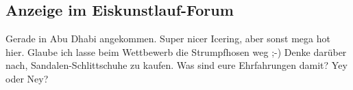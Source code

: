 \documentclass[final]{multiversum}
\begin{document}













\subsection{Anzeige im Eiskunstlauf-Forum}
Gerade in Abu Dhabi angekommen. 
Super nicer Icering, aber sonst mega hot hier.
Glaube ich lasse beim Wettbewerb die Strumpfhosen weg ;-)
Denke darüber nach, Sandalen-Schlittschuhe zu kaufen.
Was sind eure Ehrfahrungen damit?
Yey oder Ney?
\end{document}
